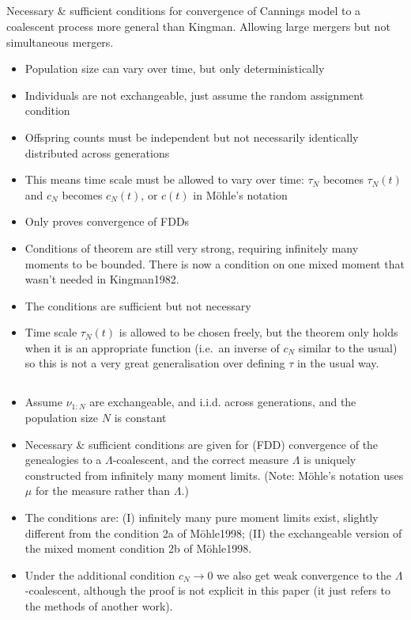 \documentclass{article}
\begin{document}
\subsection*{\cite{mohle1998}}
Necessary \& sufficient conditions for convergence of Cannings model to a coalescent process more general than Kingman. Allowing large mergers but not simultaneous mergers.
\begin{itemize}
\item Population size can vary over time, but only deterministically
\item Individuals are not exchangeable, just assume the random assignment condition
\item Offspring counts must be independent but not necessarily identically distributed across generations
\item This means time scale must be allowed to vary over time: $\tau_N$ becomes $\tau_N(t)$ and $c_N$ becomes $c_N(t)$, or $c(t)$ in M\"ohle's notation
\item Only proves convergence of FDDs
\item Conditions of theorem are still very strong, requiring infinitely many moments to be bounded. There is now a condition on one mixed moment that wasn't needed in Kingman1982.
\item The conditions are sufficient but not necessary
\item Time scale $\tau_N(t)$ is allowed to be chosen freely, but the theorem only holds when it is an appropriate function (i.e.\ an inverse of $c_N$ similar to the usual) so this is not a very great generalisation over defining $\tau$ in the usual way.
\end{itemize}


\subsection*{\cite{mohlesagitov1998}}
\begin{itemize}
\item Assume $\nu_{1:N}$ are exchangeable, and i.i.d. across generations, and the population size $N$ is constant
\item Necessary \& sufficient conditions are given for (FDD) convergence of the genealogies to a $\Lambda$-coalescent, and the correct measure $\Lambda$ is uniquely constructed from infinitely many moment limits. (Note: M\"ohle's notation uses $\mu$ for the measure rather than $\Lambda$.)
\item The conditions are: (I) infinitely many pure moment limits exist, slightly different from the condition 2a of M\"ohle1998; (II) the exchangeable version of the mixed moment condition 2b of M\"ohle1998.
\item Under the additional condition $c_N\to0$ we also get weak convergence to the $\Lambda$-coalescent, although the proof is not explicit in this paper (it just refers to the methods of another work).
\end{itemize}
\end{document}
